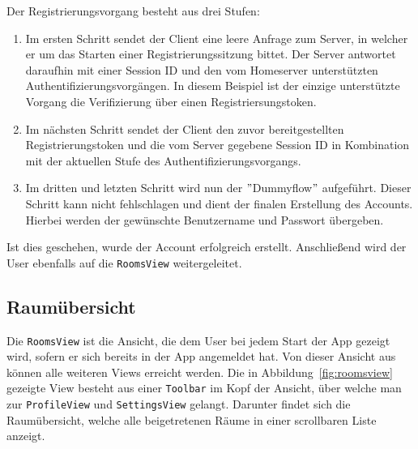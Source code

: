     Der Registrierungsvorgang besteht aus drei Stufen:
    \begin{enumerate}[label={(\arabic*)}]
        \item Im ersten Schritt sendet der Client eine leere Anfrage zum Server, in welcher er um das Starten einer Registrierungssitzung bittet.
    Der Server antwortet daraufhin mit einer Session ID und den vom Homeserver unterstützten Authentifizierungsvorgängen.
    In diesem Beispiel ist der einzige unterstützte Vorgang die Verifizierung über einen Registriersungstoken.
        \item Im nächsten Schritt sendet der Client den zuvor bereitgestellten Registrierungstoken und die vom Server gegebene Session ID in Kombination mit der aktuellen Stufe des Authentifizierungsvorgangs.
        \item Im dritten und letzten Schritt wird nun der \("\)Dummyflow\("\) aufgeführt.
    Dieser Schritt kann nicht fehlschlagen und dient der finalen Erstellung des Accounts.
    Hierbei werden der gewünschte Benutzername und Passwort übergeben.
    \end{enumerate}

    Ist dies geschehen, wurde der Account erfolgreich erstellt.
    Anschließend wird der User ebenfalls auf die \texttt{RoomsView} weitergeleitet.

    \newpage
    \subsection{Raumübersicht}\label{subsec:raumubersicht}

    Die \texttt{RoomsView} ist die Ansicht, die dem User bei jedem Start der App gezeigt wird, sofern er sich bereits in der App angemeldet hat.
    Von dieser Ansicht aus können alle weiteren Views erreicht werden.
    Die in Abbildung~\ref{fig:roomsview} gezeigte View besteht aus einer \texttt{Toolbar} im Kopf der Ansicht, über welche man zur \texttt{ProfileView} und \texttt{SettingsView} gelangt.
    Darunter findet sich die Raumübersicht, welche alle beigetretenen Räume in einer scrollbaren Liste anzeigt.

